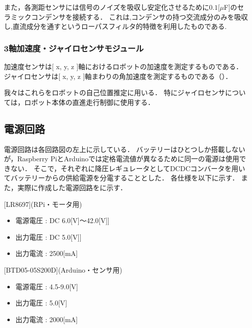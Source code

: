 \documentclass[11pt,a4]{jsarticle}
\begin{document}
      また，各測距センサには信号のノイズを吸収し安定化させるために$0.1[\mu $F]のセラミックコンデンサを接続する．
      これは,コンデンサの持つ交流成分のみを吸収し,直流成分を通すというローパスフィルタ的特徴を利用したものである.


    \subsubsection{3軸加速度・ジャイロセンサモジュール}
      加速度センサは[ x, y, z ]軸におけるロボットの加速度を測定するものである．
      ジャイロセンサは[ x, y, z ]軸まわりの角加速度を測定するものである（）．

      我々はこれらをロボットの自己位置推定に用いる．
      特にジャイロセンサについては，ロボット本体の直進走行制御に使用する．


  \subsection{電源回路}
    電源回路は各回路図の左上に示している．
    バッテリーはひとつしか搭載しないが，Raspberry PiとArduinoでは定格電流値が異なるために同一の電源は使用できない．
    そこで，それぞれに降圧レギュレータとしてDCDCコンバータを用いてバッテリーからの供給電源を分電することとした．
    各仕様を以下に示す．
    また，実際に作成した電源回路をに示す．

    [LR8697](RPi・モータ用)
    \begin{itemize}
     \item 電源電圧 : DC 6.0[V]$〜$42.0[V]]
     \item 出力電圧 : DC 5.0[V]]
     \item 出力電流 : 2500[mA]
    \end{itemize}

    [BTD05-05S200D](Arduino・センサ用)
    \begin{itemize}
     \item 電源電圧 : 4.5-9.0[V]
     \item 出力電圧 : 5.0[V]
     \item 出力電流 : 2000[mA]
    \end{itemize}

\end{document}
